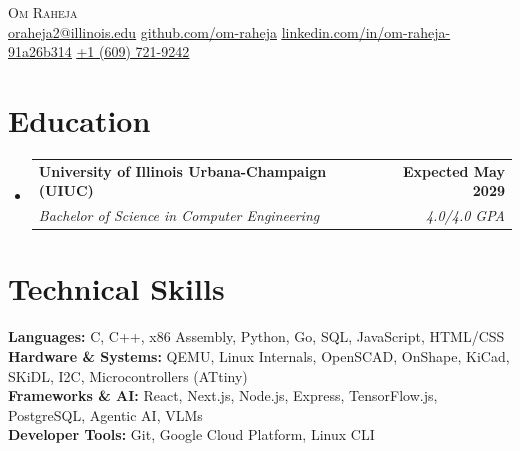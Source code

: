 \documentclass[letterpaper,11pt]{article}
\makeatletter
\newcommand{\resumeItem}[1]{
  \item\small{
    {#1 \vspace{-3pt}}
  }
}
\newcommand{\resumeSubheading}[4]{
  \item
   \begin{tabular*}{1.0\textwidth}[t]{l@{\extracolsep{\fill}}r}
      \textbf{#1} & \textbf{\small #2} \\
      \textit{\small#3} & \textit{\small #4} \\
    \end{tabular*}\vspace{-8pt}
}
\newcommand{\resumeSubHeadingListStart}{\begin{itemize}[leftmargin=0.0in, label={}]}
\newcommand{\resumeSubHeadingListEnd}{\end{itemize}}
\newcommand{\resumeItemListStart}{\begin{itemize}[leftmargin=0.15in, labelsep=0.05in]}
\newcommand{\resumeItemListEnd}{\end{itemize}\vspace{-7pt}}
\makeatother
\begin{document}

\begin{center}
    {\LARGE \scshape Om Raheja} \\ \vspace{1pt}
    \small \href{mailto:oraheja2@illinois.edu}{\underline{oraheja2@illinois.edu}} \textbar{} 
    \href{https://github.com/om-raheja}{\underline{github.com/om-raheja}} \textbar{}
    \href{https://www.linkedin.com/in/om-raheja-91a26b314/}{\underline{linkedin.com/in/om-raheja-91a26b314}} \textbar{}
    \href{tel:+16097219242}{\underline{+1 (609) 721-9242}}
    \vspace{-8pt}
\end{center}

\section{Education}
  \resumeSubHeadingListStart
    \resumeSubheading
      {University of Illinois Urbana-Champaign (UIUC)}{Expected May 2029}
      {Bachelor of Science in Computer Engineering}{4.0/4.0 GPA}
  \resumeSubHeadingListEnd

\section{Technical Skills}
  \begin{itemize}[leftmargin=0.15in, label={}]
    \small{\item{
     \textbf{Languages:} C, C++, x86 Assembly, Python, Go, SQL, JavaScript, HTML/CSS \\
     \textbf{Hardware \& Systems:} QEMU, Linux Internals, OpenSCAD, OnShape, KiCad, SKiDL, I2C, Microcontrollers (ATtiny) \\
     \textbf{Frameworks \& AI:} React, Next.js, Node.js, Express, TensorFlow.js, PostgreSQL, Agentic AI, VLMs \\
     \textbf{Developer Tools:} Git, Google Cloud Platform, Linux CLI
    }}
  \end{itemize}
  \vspace{-17pt}
\end{document}
